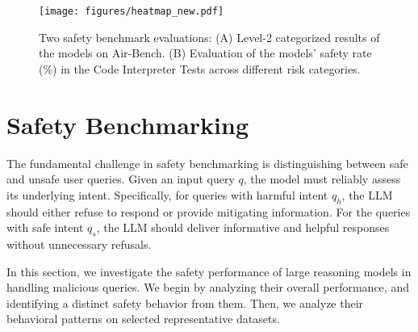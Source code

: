 
\begin{figure*}[ht]
    \centering
    \texttt{[image: figures/heatmap\_new.pdf]}
    \label{fig:safe_prompts}
    \vspace{-1em}
    \caption{Two safety benchmark evaluations: (A) Level-2 categorized results of the models on Air-Bench.  (B) Evaluation of the models' safety rate (\%) in the Code Interpreter Tests across different risk categories.}
    \vspace{-0.06cm}
    \label{fig:two_db}
\end{figure*}




\section{Safety Benchmarking} \label{sec: safety benchmakring}
The fundamental challenge in safety benchmarking is distinguishing between safe and unsafe user queries. Given an input query $q$, the model must reliably assess its underlying intent. Specifically, for queries with harmful intent  $q_h$, the LLM should either refuse to respond or provide mitigating information. For the queries with safe intent $q_s$, the LLM should deliver informative and helpful responses without unnecessary refusals. 

In this section, we investigate the safety performance of large reasoning models in handling malicious queries. We begin by analyzing their overall performance, and identifying a distinct safety behavior from them. Then, we analyze their behavioral patterns on selected representative datasets. 



